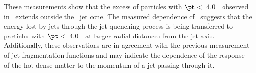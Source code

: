 
These measurements show that the excess of particles with $\pt <$~4.0~\GeV\ observed in~\cite{Aaboud:2018hpb} extends
outside the \RFour\ jet cone.
The measured dependence of \RDptr\ suggests that the energy lost by jets through the jet quenching process is being transferred to particles with $\pt <$~4.0~\GeV\ at larger radial distances from the jet axis. 
Additionally, these observations are in agreement with the previous measurement of jet fragmentation functions \cite{Chatrchyan:2014ava, Sirunyan:2018jqr, Aaboud:2017bzv, PhysRevC.98.024908} and may indicate the dependence of the response of the hot dense matter to the momentum of a jet passing through it. 


\FloatBarrier
